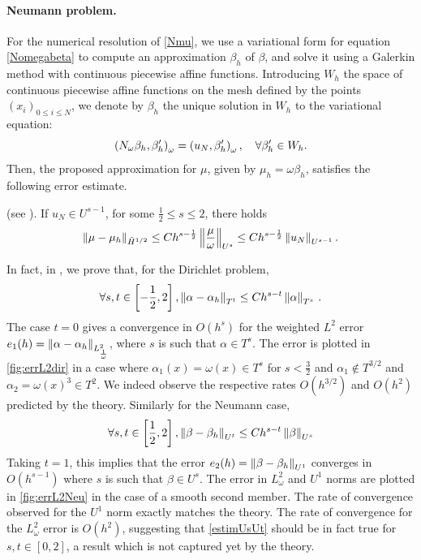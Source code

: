 \documentclass[a4paper]{article}
\begin{document}
\paragraph{Neumann problem.} For the numerical resolution of \eqref{Nmu}, we use a variational form for equation \eqref{Nomegabeta} to compute an approximation $\beta_h$ of $\beta$, and solve 
it using a Galerkin method with continuous piecewise affine functions. Introducing $W_h$ the space of continuous piecewise affine functions on the mesh
defined by the points $(x_i)_{0\leq i\leq N}$, we denote by $\beta_h$ the unique solution in $W_h$ to the variational equation:
\begin{equation}
\left( N_\omega \beta_h,\beta_h'\right)_{\omega} = \left( u_N,\beta_h'\right)_{\omega}, \quad \forall \beta_h' \in W_h.
\label{NomegaBetaGalerk}
\end{equation}
Then, the proposed approximation for $\mu$, given by $\mu_h = \omega \beta_h$, satisfies the following error estimate. 
\begin{theorem}(see \cite{averseng}).
	If $u_N \in U^{s-1}$, for some $\frac{1}{2} \leq s \leq 2$, there holds 
	\[\left\|\mu - \mu_h\right\|_{\tilde{H}^{1/2}} \leq C h^{s - \frac{1}{2}}\left\|\frac{\mu}{\omega}\right\|_{U^{s}}\leq C h^{s - \frac{1}{2}}\left\|u_N\right\|_{U^{s-1}}.\]
	\label{theOrdreCVNeumann}
\end{theorem}
In fact, in \cite{averseng}, we prove that, for the Dirichlet problem,
\[\forall s,t \in \left[-\frac{1}{2},2\right], \left\|\alpha - \alpha_h\right\|_{T^t} \leq C h^{s - t}\left\|\alpha\right\|_{T^s}\,.\] 
The case $t = 0$ gives a convergence in $O(h^s)$ for the weighted $L^2 $ error $e_1(h) = \left\|\alpha - \alpha_h\right\|_{L^2_\frac{1}{\omega}}$, where $s$ is such that $\alpha \in T^s$. The error is plotted in \autoref{fig:errL2dir} in a case where $\alpha_1(x) = \omega(x) \in T^{s}$ for $s < \frac{3}{2}$ and $\alpha_1 \notin T^{3/2}$ and $\alpha_2 = \omega(x)^3 \in T^2$. We indeed observe the respective rates $O(h^{3/2})$ and $O(h^2)$ predicted by the theory.
Similarly for the Neumann case, 
\begin{equation}
\forall s,t \in\left[\frac{1}{2}, 2\right], \left\|\beta - \beta_h\right\|_{U^t} \leq Ch^{s - t}\left\|\beta\right\|_{U^s}
\label{estimUsUt}
\end{equation} 
Taking $t=1$, this implies that the error $e_2(h) = \left\|\beta - \beta_h\right\|_{U^1}$ converges in $O(h^{s - 1})$ where $s$ is such that $\beta \in U^s$. The error in $L^2_\omega$ and $U^1$ norms are plotted in \autoref{fig:errL2Neu} in the case of a smooth second member. The rate of convergence observed for the $U^1$ norm exactly matches the theory. The rate of convergence for the $L^2_\omega$ error is $O(h^2)$, suggesting that \eqref{estimUsUt} should be in fact true for $s,t \in [0,2]$, a result which is not captured yet by the theory.
\end{document}
